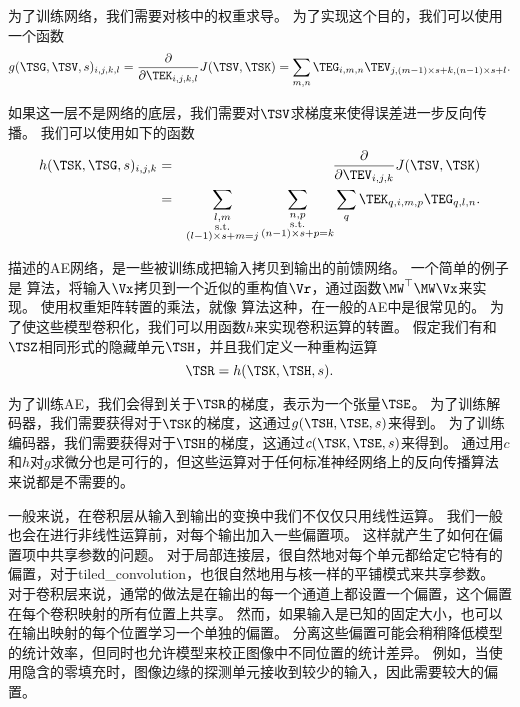 为了训练网络，我们需要对核中的权重求导。
为了实现这个目的，我们可以使用一个函数
\begin{equation}
g(\TSG, \TSV, s)_{i, j, k, l} = \frac{\partial}{\partial \TEK_{i, j, k, l}} J(\TSV, \TSK) = \sum_{m, n} \TEG_{i, m, n} \TEV_{j, (m-1)\times s+k, (n-1)\times s+l}.
\end{equation}

如果这一层不是网络的底层，我们需要对$\TSV$求梯度来使得误差进一步反向传播。
我们可以使用如下的函数
\begin{eqnarray}
h(\TSK, \TSG, s)_{i, j, k} &=& \frac{\partial }{\partial \TEV_{i, j, k}} J(\TSV, \TSK)\\
&=& \sum_{\substack{l, m\\
                  \text{s.t.}\\
                  (l-1)\times s+m = j}} \sum_{\substack{n, p\\
                                                            \text{s.t.}\\
                                                            (n-1)\times s +p = k}}
            \sum_q \TEK_{q,i,m,p} \TEG_{q, l, n}.
\end{eqnarray}

描述的\gls{AE}网络，是一些被训练成把输入拷贝到输出的前馈网络。
一个简单的例子是\,\,算法，将输入$\Vx$拷贝到一个近似的重构值$\Vr$，通过函数${\MW}^\top \MW \Vx$来实现。
使用权重矩阵转置的乘法，就像\,\,算法这种，在一般的\gls{AE}中是很常见的。
为了使这些模型卷积化，我们可以用函数$h$来实现卷积运算的转置。
假定我们有和$\TSZ$相同形式的隐藏单元$\TSH$，并且我们定义一种重构运算
\begin{equation}
\TSR = h(\TSK, \TSH, s).
\end{equation}

为了训练\gls{AE}，我们会得到关于$\TSR$的梯度，表示为一个张量$\TSE$。
为了训练解码器，我们需要获得对于$\TSK$的梯度，这通过$g(\TSH, \TSE, s)$来得到。
为了训练编码器，我们需要获得对于$\TSH$的梯度，这通过$c(\TSK, \TSE, s)$来得到。
通过用$c$和$h$对$g$求微分也是可行的，但这些运算对于任何标准神经网络上的反向传播算法来说都是不需要的。
 
 
一般来说，在卷积层从输入到输出的变换中我们不仅仅只用线性运算。
我们一般也会在进行非线性运算前，对每个输出加入一些偏置项。
这样就产生了如何在偏置项中共享参数的问题。
对于局部连接层，很自然地对每个单元都给定它特有的偏置，对于\gls{tiled_convolution}，也很自然地用与核一样的平铺模式来共享参数。
对于卷积层来说，通常的做法是在输出的每一个通道上都设置一个偏置，这个偏置在每个卷积映射的所有位置上共享。
然而，如果输入是已知的固定大小，也可以在输出映射的每个位置学习一个单独的偏置。
分离这些偏置可能会稍稍降低模型的统计效率，但同时也允许模型来校正图像中不同位置的统计差异。
例如，当使用隐含的零填充时，图像边缘的探测单元接收到较少的输入，因此需要较大的偏置。

